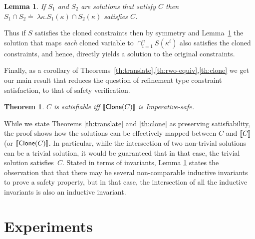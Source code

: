 \documentclass[nocopyrightspace]{sigplanconf}
\makeatletter
\newtheorem{@protheo}{Theorem}
\newenvironment{theorem}[1]{\begin{@protheo}{\rm \bf #1}\it}{\end{@protheo}}
\newtheorem{lemma}{Lemma}{\bfseries\upshape}{\itshape}
\newcommand{\defeq}{\doteq\ }
\newcommand{\Soln}{S}
\newcommand{\kvar}{\kappa}
\def\IMPSEM{{Imperative}\xspace}
\def\CLONE{{\sf Clone}}
\makeatother
\begin{document}
\begin{lemma}{}\label{lemma:solnintersect}
If $\Soln_1$ and $\Soln_2$ are solutions that satisfy $C$ 
then $\Soln_1 \cap \Soln_2 \defeq \lambda \kvar. \Soln_1(\kvar) \cap \Soln_2(\kvar)$
satisfies $C$.
\end{lemma}

Thus if $\Soln$ satisfies the cloned constraints
then by symmetry and Lemma~\ref{lemma:solnintersect} 
the solution that maps \emph{each} cloned variable 
to $\cap_{i=1}^{n}\Soln(\kvar^i)$ also satisfies 
the cloned constraints, and hence, directly yields 
a solution to the original constraints.

Finally, as a corollary of 
Theorems~\ref{th:translate},\ref{th:rwo-equiv},\ref{th:clone} 
we get our main result that reduces the question 
of refinement type constraint satisfaction,
to that of safety verification.

\begin{theorem}{}\label{th:equiv}
$C$ is satisfiable iff $\translate{\CLONE(C)}$ is \IMPSEM-safe.
\end{theorem}

While we state Theorems \ref{th:translate} and \ref{th:clone} as
preserving satisfiability, the proof shows how the solutions can be
effectively mapped between $C$ and $[\![C]\!]$ (or
$\translate{\CLONE(C)}$. 
In particular, while the intersection of two non-trivial solutions can
be a trivial solution, it would be guaranteed that in that case, the
trivial solution satisfies~$C$. 
Stated in terms of invariants, Lemma \ref{lemma:solnintersect} states
the observation that that there may be several non-comparable
inductive invariants to prove a safety property, but in that case, the
intersection of all the inductive invariants is also an inductive
invariant. 





\section{Experiments}\label{sec:experiments}


\newcommand{\invpage}[1]{
  \begin{minipage}[h]{.35\linewidth}
    \begin{displaymath}
      \begin{array}{c}
        #1\\[\jot]
      \end{array}
    \end{displaymath}
  \end{minipage}
}
\newcommand{\typepage}[1]{
  \begin{minipage}[h]{.4\linewidth}
    \begin{displaymath}
      \begin{array}{c@{\;\defeq\;}l}
        #1\\[\jot]
      \end{array}
    \end{displaymath}
  \end{minipage}
}
\end{document}
